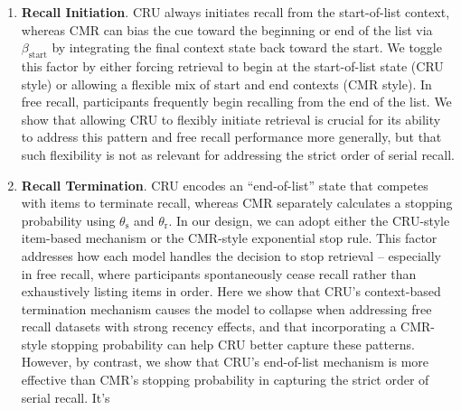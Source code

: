 \documentclass[
  letterpaper,
  DIV=11,
  numbers=noendperiod]{scrartcl}
\begin{document}
\begin{enumerate}
  learning rate by serial position in context-to-feature memory
  \(M^{CF}\) from an initial peak to a final baseline. We don't evaluate
  item confusability in free recall (\(g \rightarrow \infty\)), so for
  free recall evaluation we focus on assessing the effectiveness of
  CMR-style primacy gradient in CRU. We show that incorporating CMR's
  primacy gradient can enhance CRU's ability to capture the primacy
  effect in free recall without supposing that items can be visually
  confused with one another during encoding. In our serial recall
  evaluation, we have the item confusability mechanism and variable
  contextual integration rate activated across variants, and observe
  that incrementally adding CMR's primacy gradient has limited impact on
  performance.
\item
  \textbf{Recall Initiation}. CRU always initiates recall from the
  start-of-list context, whereas CMR can bias the cue toward the
  beginning or end of the list via \(\beta_\text{start}\) by integrating
  the final context state back toward the start. We toggle this factor
  by either forcing retrieval to begin at the start-of-list state (CRU
  style) or allowing a flexible mix of start and end contexts (CMR
  style). In free recall, participants frequently begin recalling from
  the end of the list. We show that allowing CRU to flexibly initiate
  retrieval is crucial for its ability to address this pattern and free
  recall performance more generally, but that such flexibility is not as
  relevant for addressing the strict order of serial recall.
\item
  \textbf{Recall Termination}. CRU encodes an ``end-of-list'' state that
  competes with items to terminate recall, whereas CMR separately
  calculates a stopping probability using \(\theta_\text{s}\) and
  \(\theta_\text{r}\). In our design, we can adopt either the CRU-style
  item-based mechanism or the CMR-style exponential stop rule. This
  factor addresses how each model handles the decision to stop retrieval
  -- especially in free recall, where participants spontaneously cease
  recall rather than exhaustively listing items in order. Here we show
  that CRU's context-based termination mechanism causes the model to
  collapse when addressing free recall datasets with strong recency
  effects, and that incorporating a CMR-style stopping probability can
  help CRU better capture these patterns. However, by contrast, we show
  that CRU's end-of-list mechanism is more effective than CMR's stopping
  probability in capturing the strict order of serial recall. It's

\end{enumerate}
\end{document}

